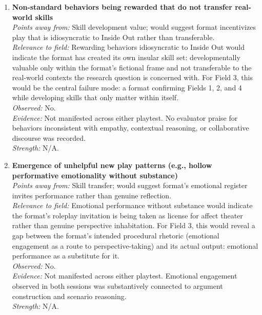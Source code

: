 \begin{enumerate}

\item \textbf{Non-standard behaviors being rewarded that do not transfer real-world skills}\\
\textit{Points away from:} Skill development value; would suggest format incentivizes play that is idiosyncratic to Inside Out rather than transferable.\\
\textit{Relevance to field:} Rewarding behaviors idiosyncratic to Inside Out would indicate the format has created its own insular skill set: developmentally valuable only within the format's fictional frame and not transferable to the real-world contexts the research question is concerned with. For Field 3, this would be the central failure mode: a format confirming Fields 1, 2, and 4 while developing skills that only matter within itself.\\
\textit{Observed:} No.\\
\textit{Evidence:} Not manifested across either playtest. No evaluator praise for behaviors inconsistent with empathy, contextual reasoning, or collaborative discourse was recorded.\\
\textit{Strength:} N/A.

\item \textbf{Emergence of unhelpful new play patterns (e.g., hollow performative emotionality without substance)}\\
\textit{Points away from:} Skill transfer; would suggest format's emotional register invites performance rather than genuine reflection.\\
\textit{Relevance to field:} Emotional performance without substance would indicate the format's roleplay invitation is being taken as license for affect theater rather than genuine perspective inhabitation. For Field 3, this would reveal a gap between the format's intended procedural rhetoric (emotional engagement as a route to perspective-taking) and its actual output: emotional performance as a substitute for it.\\
\textit{Observed:} No.\\
\textit{Evidence:} Not manifested across either playtest. Emotional engagement observed in both sessions was substantively connected to argument construction and scenario reasoning.\\
\textit{Strength:} N/A.


\end{enumerate}
